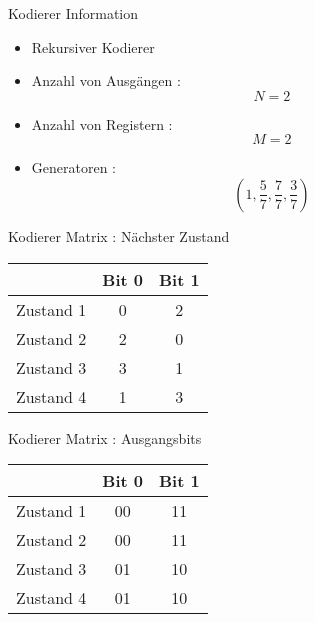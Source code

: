 \begin{frame}{Kodierer Information}

\begin{itemize}
\tightlist
\item
  Rekursiver Kodierer
\item
  Anzahl von Ausgängen : \[N=2\]
\item
  Anzahl von Registern : \[M=2\]
\item
  Generatoren : \[\left(1,\frac{5}{7},\frac{7}{7},\frac{3}{7}\right)\]
\end{itemize}

\end{frame}

\begin{frame}{Kodierer Matrix : Nächster Zustand}

\begin{longtable}[c]{@{}lcc@{}}
\toprule
& Bit 0 & Bit 1\tabularnewline
\midrule
\endhead
Zustand 1 & 0 & 2\tabularnewline
Zustand 2 & 2 & 0\tabularnewline
Zustand 3 & 3 & 1\tabularnewline
Zustand 4 & 1 & 3\tabularnewline
\bottomrule
\end{longtable}

\end{frame}

\begin{frame}{Kodierer Matrix : Ausgangsbits}

\begin{longtable}[c]{@{}lcc@{}}
\toprule
& Bit 0 & Bit 1\tabularnewline
\midrule
\endhead
Zustand 1 & 00 & 11\tabularnewline
Zustand 2 & 00 & 11\tabularnewline
Zustand 3 & 01 & 10\tabularnewline
Zustand 4 & 01 & 10\tabularnewline
\bottomrule
\end{longtable}

\end{frame}

